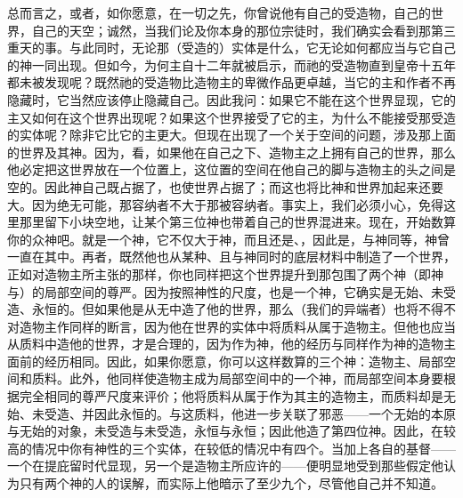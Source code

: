 总而言之，或者，如你愿意，在一切之先，你曾说他有自己的受造物，自己的世界，自己的天空；诚然，当我们论及你本身的那位宗徒时，我们确实会看到那第三重天的事。与此同时，无论那（受造的）实体是什么，它无论如何都应当与它自己的神一同出现。但如今，为何主自十二年就被启示，而祂的受造物直到皇帝十五年都未被发现呢？既然祂的受造物比造物主的卑微作品更卓越，当它的主和作者不再隐藏时，它当然应该停止隐藏自己。因此我问：如果它不能在这个世界显现，它的主又如何在这个世界出现呢？如果这个世界接受了它的主，为什么不能接受那受造的实体呢？除非它比它的主更大。但现在出现了一个关于空间的问题，涉及那上面的世界及其神。因为，看，如果他在自己之下、造物主之上拥有自己的世界，那么他必定把这世界放在一个位置上，这位置的空间在他自己的脚与造物主的头之间是空的。因此神自己既占据了，也使世界占据了；而这也将比神和世界加起来还要大。因为绝无可能，那容纳者不大于那被容纳者。事实上，我们必须小心，免得这里那里留下小块空地，让某个第三位神也带着自己的世界混进来。现在，开始数算你的众神吧。就是一个神，它不仅大于神，而且还是、，因此是，与神同等，神曾一直在其中。再者，既然他也从某种、且与神同时的底层材料中制造了一个世界，正如对造物主所主张的那样，你也同样把这个世界提升到那包围了两个神（即神与）的局部空间的尊严。因为按照神性的尺度，也是一个神，它确实是无始、未受造、永恒的。但如果他是从无中造了他的世界，那么（我们的异端者）也将不得不对造物主作同样的断言，因为他在世界的实体中将质料从属于造物主。但他也应当从质料中造他的世界，才是合理的，因为作为神，他的经历与同样作为神的造物主面前的经历相同。因此，如果你愿意，你可以这样数算的三个神：造物主、局部空间和质料。此外，他同样使造物主成为局部空间中的一个神，而局部空间本身要根据完全相同的尊严尺度来评价；他将质料从属于作为其主的造物主，而质料却是无始、未受造、并因此永恒的。与这质料，他进一步关联了邪恶——一个无始的本原与无始的对象，未受造与未受造，永恒与永恒；因此他造了第四位神。因此，在较高的情况中你有神性的三个实体，在较低的情况中有四个。当加上各自的基督——一个在提庇留时代显现，另一个是造物主所应许的——便明显地受到那些假定他认为只有两个神的人的误解，而实际上他暗示了至少九个，尽管他自己并不知道。\par


